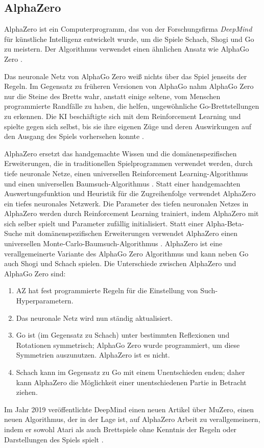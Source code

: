 \subsection{AlphaZero}
AlphaZero ist ein Computerprogramm, das von der Forschungsfirma \textit{DeepMind} für künstliche Intelligenz entwickelt wurde, um die Spiele Schach, Shogi und Go zu meistern. Der Algorithmus verwendet einen ähnlichen Ansatz wie AlphaGo Zero \cite{SilverHubert2017}. 


Das neuronale Netz von AlphaGo Zero weiß nichts über das Spiel jenseits der Regeln. Im Gegensatz zu früheren Versionen von AlphaGo nahm AlphaGo Zero nur die Steine des Bretts wahr, anstatt einige seltene, vom Menschen programmierte Randfälle zu haben, die helfen, ungewöhnliche Go-Brettstellungen zu erkennen. Die KI beschäftigte sich mit dem Reinforcement Learning und spielte gegen sich selbst, bis sie ihre eigenen Züge und deren Auswirkungen auf den Ausgang des Spiels vorhersehen konnte \cite{Greenemeier2017}.


AlphaZero ersetzt das handgemachte Wissen und die domänenspezifischen Erweiterungen, die in traditionellen Spielprogrammen verwendet werden, durch tiefe neuronale Netze, einen universellen Reinforcement Learning-Algorithmus und einen universellen Baumsuch-Algorithmus \cite{Silver2018}. 
Statt einer handgemachten Auswertungsfunktion und Heuristik für die Zugreihenfolge verwendet AlphaZero ein tiefes neuronales Netzwerk. Die Parameter des tiefen neuronalen Netzes in AlphaZero werden durch Reinforcement Learning trainiert, indem AlphaZero mit sich selber spielt und Parameter zufällig initialisiert. Statt einer Alpha-Beta-Suche mit domänenspezifischen Erweiterungen verwendet AlphaZero einen universellen Monte-Carlo-Baumsuch-Algorithmus \cite{Silver2018}. AlphaZero ist eine verallgemeinerte Variante des AlphaGo Zero Algorithmus und kann neben Go auch Shogi und Schach spielen. Die Unterschiede zwischen AlphaZero und AlphaGo Zero sind: \cite{Silver2018}
\begin{enumerate}
	\item AZ hat fest programmierte Regeln für die Einstellung von Such-Hyperparametern.
	\item Das neuronale Netz wird nun ständig aktualisiert.
	\item Go ist (im Gegensatz zu Schach) unter bestimmten Reflexionen und Rotationen symmetrisch; AlphaGo Zero wurde programmiert, um diese Symmetrien auszunutzen. AlphaZero ist es nicht.
	\item Schach kann im Gegensatz zu Go mit einem Unentschieden enden; daher kann AlphaZero die Möglichkeit einer unentschiedenen Partie in Betracht ziehen.
\end{enumerate}
Im Jahr 2019 veröffentlichte DeepMind einen neuen Artikel über MuZero, einen neuen Algorithmus, der in der Lage ist, auf AlphaZero Arbeit zu verallgemeinern, indem er sowohl Atari als auch Brettspiele ohne Kenntnis der Regeln oder Darstellungen des Spiels spielt \cite{Silver_2019}. 






